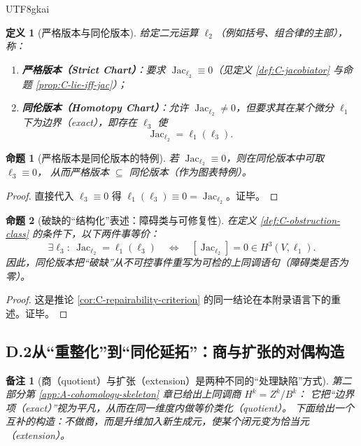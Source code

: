 \documentclass[12pt]{article}
\newtheorem{definition}{定义}[section]
\newtheorem{proposition}{命题}[section]
\newtheorem{remark}{备注}[section]
\begin{document}
\begin{CJK*}{UTF8}{gkai}
\begin{definition}[严格版本与同伦版本]\label{def:D-strict-vs-homotopy}
给定二元运算 $\ell_2$（例如括号、组合律的主部），称：
\begin{enumerate}
  \item \textbf{严格版本（Strict Chart）}：要求 $\operatorname{Jac}_{\ell_2}\equiv 0$（见定义 \ref{def:C-jacobiator} 与命题 \ref{prop:C-lie-iff-jac}）；
  \item \textbf{同伦版本（Homotopy Chart）}：允许 $\operatorname{Jac}_{\ell_2}\neq 0$，但要求其在某个微分 $\ell_1$ 下为边界（exact），即存在 $\ell_3$
    使
  \[
    \operatorname{Jac}_{\ell_2}=\ell_1(\ell_3).
  \]
\end{enumerate}
\end{definition}

\begin{proposition}[严格版本是同伦版本的特例]\label{prop:D-strict-special-case}
若 $\operatorname{Jac}_{\ell_2}\equiv 0$，则在同伦版本中可取 $\ell_3\equiv 0$，
从而严格版本 $\subseteq$ 同伦版本（作为图表特例）。
\end{proposition}
\begin{proof}
直接代入 $\ell_3\equiv 0$ 得 $\ell_1(\ell_3)\equiv 0=\operatorname{Jac}_{\ell_2}$。证毕。
\end{proof}

\begin{proposition}[破缺的“结构化”表述：障碍类与可修复性]\label{prop:D-obstruction-structured}
在定义 \ref{def:C-obstruction-class} 的条件下，以下两件事等价：
\[
  \exists \ell_3:\ \operatorname{Jac}_{\ell_2}=\ell_1(\ell_3)
  \quad\Longleftrightarrow\quad
  [\operatorname{Jac}_{\ell_2}]=0\in H^3(V,\ell_1).
\]
因此，同伦版本把“破缺”从不可控事件重写为可检的上同调语句（障碍类是否为零）。
\end{proposition}
\begin{proof}
这是推论 \ref{cor:C-repairability-criterion} 的同一结论在本附录语言下的重述。证毕。
\end{proof}

\subsection{D.2\;从“重整化”到“同伦延拓”：商与扩张的对偶构造}

\begin{remark}[商（quotient）与扩张（extension）是两种不同的“处理缺陷”方式]\label{rem:D-quotient-vs-extension}
第二部分第 \ref{app:A-cohomology-skeleton} 章已给出上同调商 $H^k=Z^k/B^k$：
它把“边界项（exact）”视为平凡，从而\emph{在同一维度内}做等价类化（quotient）。
下面给出一个互补的构造：\emph{不做商}，而是\emph{升维加入新生成元}，使某个闭元变为恰当元（extension）。
\end{remark}


\end{CJK*}
\end{document}
